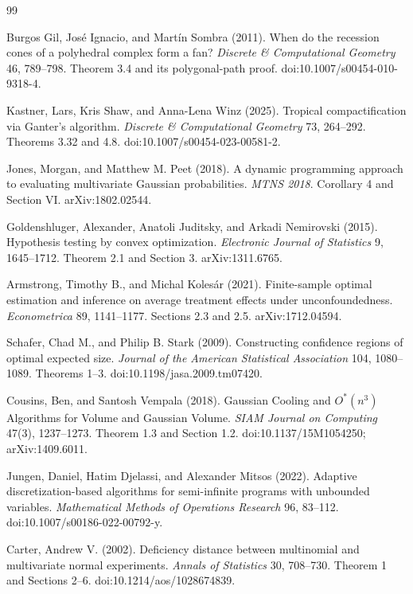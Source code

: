 \documentclass{article}
\begin{document}
\begin{thebibliography}{99}

   Burgos Gil, José Ignacio, and Martín Sombra (2011). When do the recession cones of a polyhedral complex form a fan? \emph{Discrete \& Computational Geometry} 46, 789--798. Theorem 3.4 and its polygonal-path proof. doi:10.1007/s00454-010-9318-4.

   Kastner, Lars, Kris Shaw, and Anna-Lena Winz (2025). Tropical compactification via Ganter's algorithm. \emph{Discrete \& Computational Geometry} 73, 264--292. Theorems 3.32 and 4.8. doi:10.1007/s00454-023-00581-2.

   Jones, Morgan, and Matthew M. Peet (2018). A dynamic programming approach to evaluating multivariate Gaussian probabilities. \emph{MTNS 2018}. Corollary 4 and Section VI. arXiv:1802.02544.

   Goldenshluger, Alexander, Anatoli Juditsky, and Arkadi Nemirovski (2015). Hypothesis testing by convex optimization. \emph{Electronic Journal of Statistics} 9, 1645--1712. Theorem 2.1 and Section 3. arXiv:1311.6765.

   Armstrong, Timothy B., and Michal Kolesár (2021). Finite-sample optimal estimation and inference on average treatment effects under unconfoundedness. \emph{Econometrica} 89, 1141--1177. Sections 2.3 and 2.5. arXiv:1712.04594.

   Schafer, Chad M., and Philip B. Stark (2009). Constructing confidence regions of optimal expected size. \emph{Journal of the American Statistical Association} 104, 1080--1089. Theorems 1--3. doi:10.1198/jasa.2009.tm07420.

   Cousins, Ben, and Santosh Vempala (2018). Gaussian Cooling and \(O^*(n^3)\) Algorithms for Volume and Gaussian Volume. \emph{SIAM Journal on Computing} 47(3), 1237--1273. Theorem 1.3 and Section 1.2. doi:10.1137/15M1054250; arXiv:1409.6011.

   Jungen, Daniel, Hatim Djelassi, and Alexander Mitsos (2022). Adaptive discretization-based algorithms for semi-infinite programs with unbounded variables. \emph{Mathematical Methods of Operations Research} 96, 83--112. doi:10.1007/s00186-022-00792-y.

   Carter, Andrew V. (2002). Deficiency distance between multinomial and multivariate normal experiments. \emph{Annals of Statistics} 30, 708--730. Theorem 1 and Sections 2--6. doi:10.1214/aos/1028674839.


\end{thebibliography}
\end{document}
